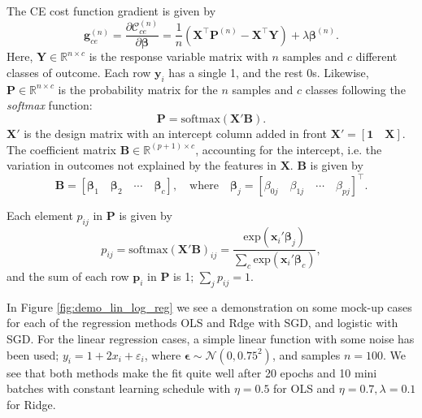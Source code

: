 \documentclass[]{article}
\begin{document}
The CE cost function gradient is given by
\begin{equation} \label{cost-mse}
	\mathbf{g}_{ce}^{(n)} = \frac{\partial \mathcal{C}_{ce}^{(n)}}{\partial \mathbf{\beta}} = \frac{1}{n} (\mathbf{X}^\intercal \mathbf{P}^{(n)} - \mathbf{X}^\intercal \mathbf{Y}) + \lambda \mathbf{\beta}^{(n)}.
\end{equation}
Here, $\mathbf{Y} \in \mathbb{R}^{n \times c}$ is the response variable matrix with $n$ samples and $c$ different classes of outcome. Each row $\mathbf{y}_i$ has a single 1, and the rest 0s. Likewise, $\mathbf{P} \in \mathbb{R}^{n \times c}$ is the probability matrix for the $n$ samples and $c$ classes following the \textit{softmax} function:
\begin{equation}
	\mathbf{P} = \mathrm{softmax}(\mathbf{X}'\mathbf{B}).
\end{equation}
$\mathbf{X}'$ is the design matrix with an intercept column added in front $\mathbf{X}' = [\mathbf{1} \quad \mathbf{X}]$. The coefficient matrix $\mathbf{B} \in \mathbb{R}^{(p+1) \times c}$, accounting for the intercept, i.e. the variation in outcomes not explained by the features in $\mathbf{X}$. $\mathbf{B}$ is given by
\begin{equation}
	\mathbf{B} = [\mathbf{\beta}_1 \quad \mathbf{\beta}_2 \quad \cdots \quad \mathbf{\beta}_c], \quad \text{where} \quad \mathbf{\beta}_j = [\beta_{0j} \quad \beta_{1j} \quad \cdots \quad \beta_{pj}]^\intercal.
\end{equation}

Each element $p_{ij}$ in $\mathbf{P}$ is given by
\begin{equation} \label{log-reg-pij}
	p_{ij} = \mathrm{softmax}(\mathbf{X}'\mathbf{B})_{ij} = \frac{\mathrm{exp}(\mathbf{x}_i'\mathbf{\beta}_j)} {\sum_{c}\mathrm{exp}(\mathbf{x}_i'\mathbf{\beta}_c)},
\end{equation}
and the sum of each row $\mathbf{p}_i$ in $\mathbf{P}$ is 1; $\sum_{j} p_{ij} = 1$.

\vspace{5mm}

In Figure \ref{fig:demo_lin_log_reg} we see a demonstration on some mock-up cases for each of the regression methods OLS and Rdge with SGD, and logistic with SGD. For the linear regression cases, a simple linear function with some noise has been used; $y_i = 1 + 2x_i + \varepsilon_i$, where $\mathbf{\epsilon} \sim \mathcal{N}(0, 0.75^2)$, and samples $n=100$. We see that both methods make the fit quite well after 20 epochs and 10 mini batches with constant learning schedule with $\eta = 0.5$ for OLS and $\eta = 0.7, \lambda=0.1$ for Ridge.
\end{document}

